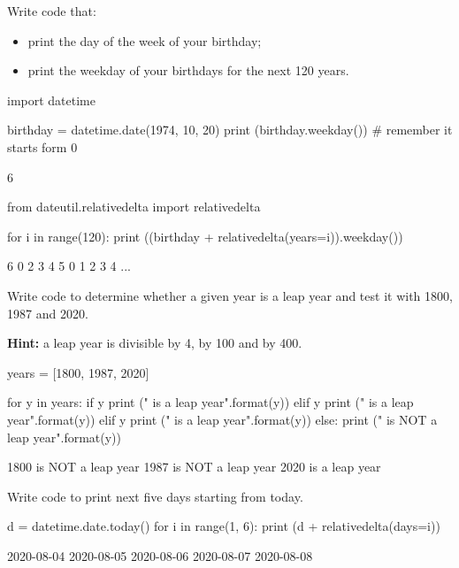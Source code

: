 \begin{question}
Write code that:

\begin{itemize}
\item print the day of the week of your birthday;
\item print the weekday of your birthdays for the next 120 years.
\end{itemize}
\end{question}

\cprotEnv\begin{solution}
\begin{ipython}
import datetime

birthday = datetime.date(1974, 10, 20)
print (birthday.weekday()) # remember it starts form 0

6

from dateutil.relativedelta import relativedelta

for i in range(120):
    print ((birthday + relativedelta(years=i)).weekday())

6
0
2
3
4
5
0
1
2
3
4
...
\end{ipython}
\end{solution}

\begin{question}
Write code to determine whether a given year is a leap year and test it with 1800, 1987 and 2020.

\noindent\textbf{Hint:} a leap year is divisible by 4, by 100 and by 400.
\end{question}

\cprotEnv\begin{solution}
\begin{ipython}
years = [1800, 1987, 2020]

for y in years:
    if y %
        print ("{} is a leap year".format(y))
	elif y %
        print ("{} is a leap year".format(y)) 
    elif y %
        print ("{} is a leap year".format(y))
    else:
        print ("{} is NOT a leap year".format(y))

1800 is NOT a leap year
1987 is NOT a leap year
2020 is a leap year        
\end{ipython}  
\end{solution}

\begin{question}
Write code to print next five days starting from today.
\end{question}

\cprotEnv\begin{solution}
\begin{ipython}
d = datetime.date.today()
for i in range(1, 6):
     print (d + relativedelta(days=i))

2020-08-04
2020-08-05
2020-08-06
2020-08-07
2020-08-08
\end{ipython}
\end{solution}

